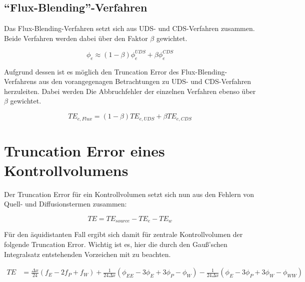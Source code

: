 \documentclass[11pt, ngerman,colorback,accentcolor=tud2d]{tudreport}
\begin{document}




\subsection{``Flux-Blending''-Verfahren}

Das Flux-Blending-Verfahren setzt sich aus UDS- und CDS-Verfahren zusammen. Beide
Verfahren werden dabei über den Faktor $\beta$ gewichtet.

\begin{equation*}
\phi_e \approx (1-\beta)\phi_e^{UDS} + \beta \phi_e^{CDS} 
\end{equation*}

Aufgrund dessen ist es möglich den Truncation Error des Flux-Blending-Verfahrens aus
den vorangegenagen Betrachtungen zu UDS- und CDS-Verfahren herzuleiten.
Dabei werden Die Abbruchfehler der einzelnen Verfahren ebenso über $\beta$ gewichtet.

\begin{equation}
  TE_{e, Flux} = (1-\beta) TE_{e, UDS} + \beta TE_{e, CDS}
\end{equation}



\section{Truncation Error eines Kontrollvolumens}
\label{sec:Truncation Error eines Kontrollvolumens}

Der Truncation Error für ein Kontrollvolumen setzt sich nun aus den Fehlern von Quell-
und Diffusionstermen zusammen:

\begin{equation*}
  TE = TE_{source} - TE_e - TE_w
\end{equation*}

Für den äquidistanten Fall ergibt sich damit für zentrale Kontrollvolumen der folgende
Truncation Error. Wichtig ist es, hier die durch den Gauß'schen Integralsatz 
entstehenden Vorzeichen mit zu beachten.

\begin{align}
  TE &= \frac{\Delta x}{24} \left({f_E-2f_P+f_W}\right)
   +\frac{1}{24\Delta x}\left({
\phi_{EE}-3\phi_E+3\phi_P-\phi_W}\right)
  -\frac{1}{24 \Delta x}\left({
\phi_E-3\phi_P+3\phi_W-\phi_{WW}}\right)
\end{align}
\end{document}
